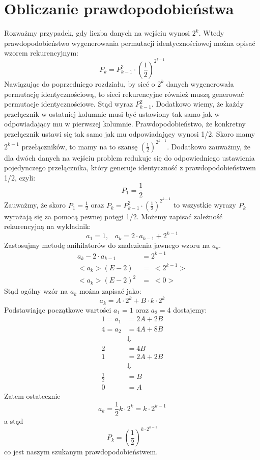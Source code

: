 \documentclass{article}
\begin{document}
\section{Obliczanie prawdopodobieństwa}
Rozważmy przypadek, gdy liczba danych na wejściu wynosi $2^k$. Wtedy prawdopodobieństwo wygenerowania permutacji identycznościowej można opisać wzorem rekurencyjnym:
\begin{equation}
    \displaystyle P_{k} = P_{k-1}^2 \cdot \left(\frac{1}{2}\right)^{2^{k-1}}
\end{equation}
Nawiązując do poprzedniego rozdziału, by sieć o $2^k$ danych wygenerowała permutację identycznościową, to  sieci rekurencyjne również muszą generować permutacje identycznościowe. Stąd wyraz $P_{k-1}^2$. Dodatkowo wiemy, że każdy przełącznik w ostatniej kolumnie musi być ustawiony tak samo jak w odpowiadający mu w pierwszej kolumnie. Prawdopodobieństwo, że konkretny przełącznik ustawi się tak samo jak mu odpowiadający wynosi 1/2. Skoro mamy $2^{k-1}$ przełączników, to mamy na to szansę $\left(\frac{1}{2}\right)^{2^{k-1}}$. Dodatkowo zauważmy, że dla dwóch danych na wejściu problem redukuje się do odpowiedniego ustawienia pojedynczego przełącznika, który generuje identyczność z prawdopodobieństwem 1/2, czyli:
\begin{equation}
    P_1 = \frac{1}{2}
\end{equation}
Zauważmy, że skoro $P_1 = \frac{1}{2}$ oraz $ P_{k} = P_{k-1}^2 \cdot \left(\frac{1}{2}\right)^{2^{k-1}}$ to wszystkie wyrazy $P_k$ wyrażają się za pomocą pewnej potęgi 1/2. Możemy zapisać zależność rekurencyjną na wykładnik:
\begin{equation}
    a_1 = 1, \; \; \; a_k = 2\cdot a_{k-1} + 2^{k-1}
\end{equation}
Zastosujmy metodę anihilatorów do znalezienia jawnego wzoru na $a_k$.
\begin{align*}
    a_k - 2\cdot a_{k-1} &= 2^{k-1} \\
    <a_k> (E-2) &=\; <2^{k-1}> \\
    <a_k> (E-2)^2 &=\; <0> 
\end{align*}
Stąd ogólny wzór na $a_k$ można zapisać jako:
\begin{equation}
    a_k = A\cdot 2^k + B\cdot k\cdot 2^k
\end{equation}
Podstawiając początkowe wartości $a_1 = 1$ oraz $a_2 = 4$ dostajemy:
\begin{align*}
    1 = a_1 &= 2A + 2B \\
    4 = a_2 &= 4A + 8B \\
    &\Downarrow \\
    2 &= 4B \\
    1 &= 2A + 2B \\
    &\Downarrow \\
    \frac{1}{2} &= B \\
    0 & = A
\end{align*}
Zatem ostatecznie
\begin{equation}
    a_k = \frac{1}{2}k\cdot 2^k = k\cdot 2^{k-1}
\end{equation}
a stąd
\begin{equation}
    P_k = \left(\frac{1}{2}\right)^{k\cdot 2^{k-1}}
\end{equation}
co jest naszym szukanym prawdopodobieństwem.
\end{document}
